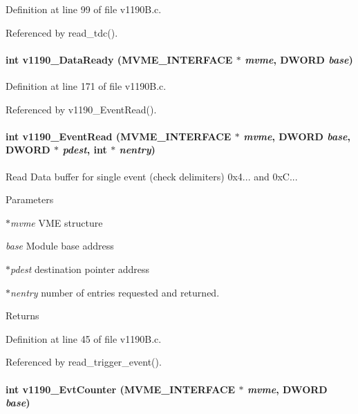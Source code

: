 Definition at line 99 of file v1190B.c.

Referenced by read\_\-tdc().
\paragraph[{v1190\_\-DataReady}]{\setlength{\rightskip}{0pt plus 5cm}int v1190\_\-DataReady ({\bf MVME\_\-INTERFACE} $\ast$ {\em mvme}, \/  {\bf DWORD} {\em base})}\hfill\label{v1190B_8c_aff0189a9073aa7400603ee51fc2cc6b7}


Definition at line 171 of file v1190B.c.

Referenced by v1190\_\-EventRead().
\paragraph[{v1190\_\-EventRead}]{\setlength{\rightskip}{0pt plus 5cm}int v1190\_\-EventRead ({\bf MVME\_\-INTERFACE} $\ast$ {\em mvme}, \/  {\bf DWORD} {\em base}, \/  {\bf DWORD} $\ast$ {\em pdest}, \/  int $\ast$ {\em nentry})}\hfill\label{v1190B_8c_a2e170ba3dc7d7492affdfad8fbc6338b}
Read Data buffer for single event (check delimiters) 0x4... and 0xC... 
\begin{DoxyParams}{Parameters}
\item[{\em $\ast$mvme}]VME structure \item[{\em base}]Module base address \item[{\em $\ast$pdest}]destination pointer address \item[{\em $\ast$nentry}]number of entries requested and returned. \end{DoxyParams}
\begin{DoxyReturn}{Returns}

\end{DoxyReturn}


Definition at line 45 of file v1190B.c.

Referenced by read\_\-trigger\_\-event().
\paragraph[{v1190\_\-EvtCounter}]{\setlength{\rightskip}{0pt plus 5cm}int v1190\_\-EvtCounter ({\bf MVME\_\-INTERFACE} $\ast$ {\em mvme}, \/  {\bf DWORD} {\em base})}\hfill\label{v1190B_8c_aacf390708ffd7c15a64367d3bfedfe5c}


